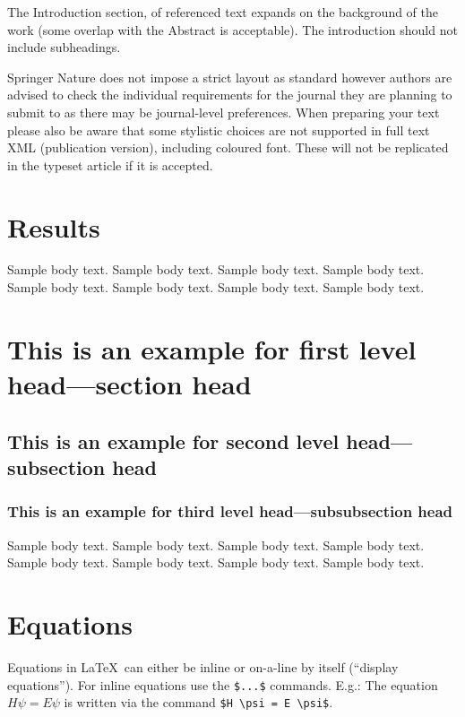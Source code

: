 \documentclass[sn-mathphys]{sn-jnl}%
\theoremstyle{thmstyleone}%
\theoremstyle{thmstyletwo}%
\theoremstyle{thmstylethree}%
\begin{document}
 
The Introduction section, of referenced text \cite{bib1} expands on the background of the work (some overlap with the Abstract is acceptable). The introduction should not include subheadings.

Springer Nature does not impose a strict layout as standard however authors are advised to check the individual requirements for the journal they are planning to submit to as there may be journal-level preferences. When preparing your text please also be aware that some stylistic choices are not supported in full text XML (publication version), including coloured font. These will not be replicated in the typeset article if it is accepted. 

\section{Results}\label{sec2}

Sample body text. Sample body text. Sample body text. Sample body text. Sample body text. Sample body text. Sample body text. Sample body text.

\section{This is an example for first level head---section head}\label{sec3}

\subsection{This is an example for second level head---subsection head}\label{subsec2}

\subsubsection{This is an example for third level head---subsubsection head}\label{subsubsec2}

Sample body text. Sample body text. Sample body text. Sample body text. Sample body text. Sample body text. Sample body text. Sample body text. 

\section{Equations}\label{sec4}

Equations in \LaTeX\ can either be inline or on-a-line by itself (``display equations''). For
inline equations use the \verb+$...$+ commands. E.g.: The equation
$H\psi = E \psi$ is written via the command \verb+$H \psi = E \psi$+.
\end{document}
